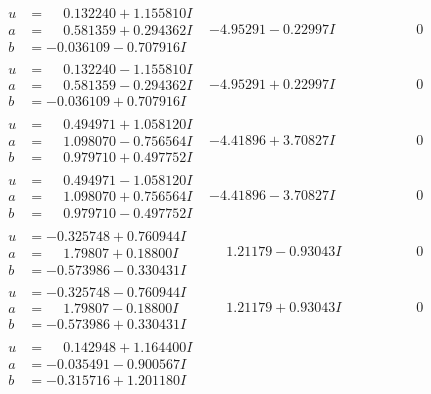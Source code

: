 \documentclass[1p]{elsarticle_modified}
\theoremstyle{definition}
\begin{document}
$$\begin{array}{c|c|c}
\begin{aligned}
u &= \phantom{-}0.132240 + 1.155810 I \\
a &= \phantom{-}0.581359 + 0.294362 I \\
b &= -0.036109 - 0.707916 I\end{aligned}
 & -4.95291 - 0.22997 I & \phantom{-0.000000 } 0 \\ \hline\begin{aligned}
u &= \phantom{-}0.132240 - 1.155810 I \\
a &= \phantom{-}0.581359 - 0.294362 I \\
b &= -0.036109 + 0.707916 I\end{aligned}
 & -4.95291 + 0.22997 I & \phantom{-0.000000 } 0 \\ \hline\begin{aligned}
u &= \phantom{-}0.494971 + 1.058120 I \\
a &= \phantom{-}1.098070 - 0.756564 I \\
b &= \phantom{-}0.979710 + 0.497752 I\end{aligned}
 & -4.41896 + 3.70827 I & \phantom{-0.000000 } 0 \\ \hline\begin{aligned}
u &= \phantom{-}0.494971 - 1.058120 I \\
a &= \phantom{-}1.098070 + 0.756564 I \\
b &= \phantom{-}0.979710 - 0.497752 I\end{aligned}
 & -4.41896 - 3.70827 I & \phantom{-0.000000 } 0 \\ \hline\begin{aligned}
u &= -0.325748 + 0.760944 I \\
a &= \phantom{-}1.79807 + 0.18800 I \\
b &= -0.573986 - 0.330431 I\end{aligned}
 & \phantom{-}1.21179 - 0.93043 I & \phantom{-0.000000 } 0 \\ \hline\begin{aligned}
u &= -0.325748 - 0.760944 I \\
a &= \phantom{-}1.79807 - 0.18800 I \\
b &= -0.573986 + 0.330431 I\end{aligned}
 & \phantom{-}1.21179 + 0.93043 I & \phantom{-0.000000 } 0 \\ \hline\begin{aligned}
u &= \phantom{-}0.142948 + 1.164400 I \\
a &= -0.035491 - 0.900567 I \\
b &= -0.315716 + 1.201180 I\end{aligned}

\end{array}$$
\end{document}

